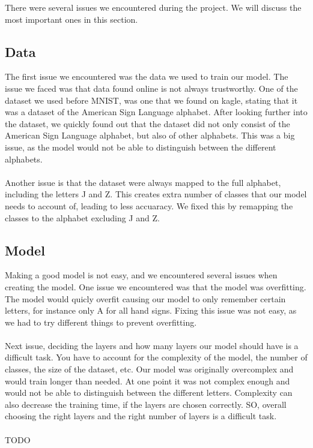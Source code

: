 \documentclass[../paper.tex]{subfiles}
\begin{document}
There were several issues we encountered during the project. 
We will discuss the most important ones in this section.
\subsection{Data}
The first issue we encountered was the data we used to train our model.
The issue we faced was that data found online is not always trustworthy.
One of the dataset we used before MNIST, was one that we found on kagle, stating that it was a dataset of the American Sign Language alphabet.
After looking further into the dataset, we quickly found out that the dataset did not only consist of the American Sign Language alphabet, but also of other alphabets.
This was a big issue, as the model would not be able to distinguish between the different alphabets.\\
\\
Another issue is that the dataset were always mapped to the full alphabet, including the letters J and Z.
This creates extra number of classes that our model needs to account of, leading to less accuaracy.
We fixed this by remapping the classes to the alphabet excluding J and Z.
\subsection{Model}
Making a good model is not easy, and we encountered several issues when creating the model.
One issue we encountered was that the model was overfitting. 
The model would quicly overfit causing our model to only remember certain letters, for instance only A for all hand signs.
Fixing this issue was not easy, as we had to try different things to prevent overfitting.\\
\\
Next issue, deciding the layers and how many layers our model should have is a difficult task.
You have to account for the complexity of the model, the number of classes, the size of the dataset, etc.
Our model was originally overcomplex and would train longer than needed. 
At one point it was not complex enough and would not be able to distinguish between the different letters.
Complexity can also decrease the training time, if the layers are chosen correctly.
SO, overall choosing the right layers and the right number of layers is a difficult task.
\\\\
TODO
\end{document}

